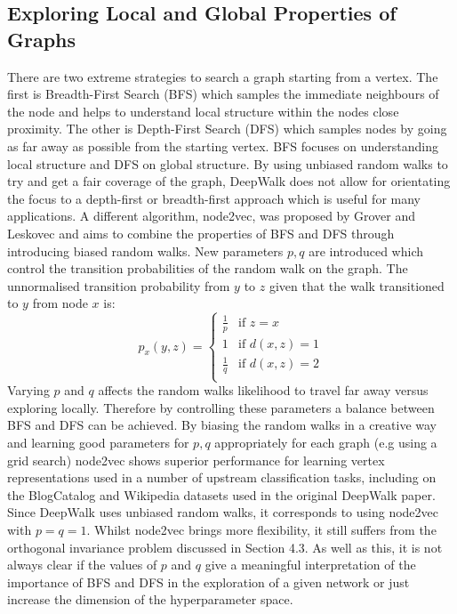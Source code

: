 \documentclass[a4paper]{article}
\begin{document}
\subsection{Exploring Local and Global Properties of Graphs}
There are two extreme strategies to search a graph starting from a vertex. The
first is Breadth-First Search (BFS) which samples the immediate neighbours of
the node and helps to understand local structure within the nodes close
proximity. The other is Depth-First Search (DFS) which samples nodes by going as
far away as possible from the starting vertex. BFS focuses on understanding
local structure and DFS on global structure. By using unbiased random walks to
try and get a fair coverage of the graph, DeepWalk does not allow for
orientating the focus to a depth-first or breadth-first approach which is useful
for many applications. A different algorithm, node2vec, was proposed by Grover
and Leskovec\cite{grover_leskovec2016} and aims to combine the
properties of BFS and DFS through introducing biased random walks. New
parameters $p,q$ are introduced which control the transition probabilities of
the random walk on the graph. The unnormalised transition probability from $y$
to $z$ given that the walk transitioned to $y$ from node $x$ is:
\begin{equation}
  p_x(y,z)= 
  \begin{cases}
    \frac{1}{p}& \text{if } z = x\\
    1          & \text{if } d(x,z) = 1\\
    \frac{1}{q}& \text{if } d(x,z) = 2\\
  \end{cases}
\end{equation}
Varying $p$ and $q$ affects the random walks likelihood to travel far away
versus exploring locally. Therefore by controlling these parameters a balance
between BFS and DFS can be achieved. By biasing the random walks in a creative
way and learning good parameters for $p,q$ appropriately for each graph (e.g
using a grid search) node2vec shows superior performance for learning vertex
representations used in a number of upstream classification tasks, including on
the BlogCatalog and Wikipedia datasets used in the original DeepWalk paper.\\
Since DeepWalk uses unbiased random walks, it corresponds to using node2vec with $p=q=1$. Whilst node2vec brings
more flexibility, it still suffers from the orthogonal invariance problem discussed in Section 4.3. As well as this, it is not always clear if the values of $p$ and $q$ give a
meaningful interpretation of the importance of BFS and DFS in the exploration of a given network or just increase the dimension of the hyperparameter space.
\end{document}
